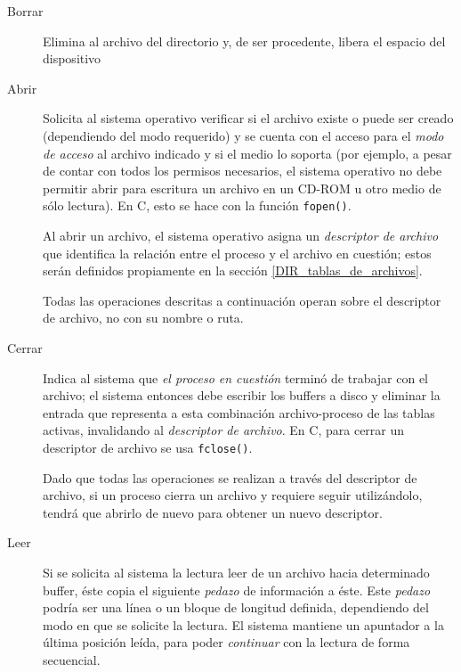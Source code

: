 \documentclass[11pt,fleqn]{book} %
\begin{document}
\begin{description}
\item[Borrar] Elimina al archivo del directorio y, de ser procedente,
            libera el espacio del dispositivo
\item[Abrir] Solicita al sistema operativo verificar si el archivo existe o
	   puede ser creado (dependiendo del modo requerido) y se cuenta con el
           acceso para el \emph{modo de acceso} al archivo indicado y
           si el medio lo soporta (por ejemplo, a pesar de contar con
           todos los permisos necesarios, el sistema operativo no debe
           permitir abrir para escritura un archivo en un CD-ROM u
           otro medio de sólo lectura). En C, esto se hace con la
           función \texttt{fopen()}.

	   Al abrir un archivo, el sistema operativo asigna un
           \emph{descriptor de archivo} que identifica la relación entre
           el proceso y el archivo en cuestión; estos serán definidos
           propiamente en la sección \ref{DIR_tablas_de_archivos}.

	   Todas las operaciones descritas a continuación operan sobre
           el descriptor de archivo, no con su nombre o ruta.
\item[Cerrar] Indica al sistema que \emph{el proceso en cuestión} terminó de
            trabajar con el archivo; el sistema entonces debe escribir
            los buffers a disco y eliminar la entrada que representa a
            esta combinación archivo-proceso de las tablas activas,
            invalidando al \emph{descriptor de archivo}. En C, para cerrar
            un descriptor de archivo se usa \texttt{fclose()}.

	    Dado que todas las operaciones se realizan a través del
            descriptor de archivo, si un proceso cierra un archivo y
            requiere seguir utilizándolo, tendrá que abrirlo de nuevo
            para obtener un nuevo descriptor.
\item[Leer] Si se solicita al sistema la lectura leer de un archivo
          hacia determinado buffer, éste copia el siguiente \emph{pedazo}
          de información a éste. Este \emph{pedazo} podría ser una línea o
          un bloque de longitud definida, dependiendo del modo en que
          se solicite la lectura. El sistema mantiene un apuntador a
          la última posición leída, para poder \emph{continuar} con la
          lectura de forma secuencial.


\end{description}
\end{document}
